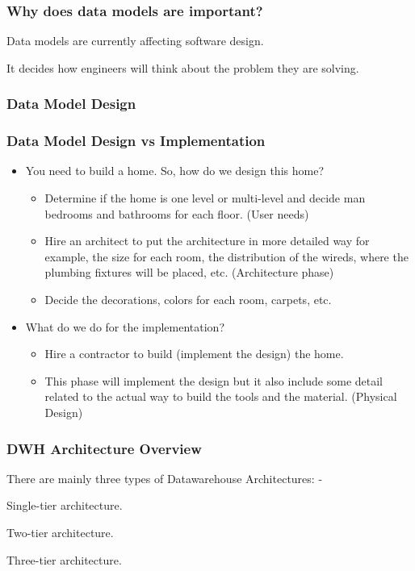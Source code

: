\begin{frame}
\frametitle{Why does data models are important?}
\begin{wideitemize}	
	\item Data models are currently affecting software design. 
	\item It decides how engineers will think about the problem they are solving.
\end{wideitemize}
\end{frame}
\subsubsection{Data Model Design}
\begin{frame}
\frametitle{Data Model Design vs Implementation}
\begin{itemize}[<+->]
	\item You need to build a home. So, how do we design this home?
		\begin{itemize}[<+->]
			\item Determine if the home is one level or multi-level and decide man bedrooms and bathrooms for each floor. (User needs)
			\item Hire an architect to put the architecture in more detailed way for example, the size for each room, the distribution of the wireds, where the plumbing fixtures will be placed, etc. (Architecture phase)
			\item Decide the decorations, colors for each room, carpets, etc. 
		\end{itemize}
	\item What do we do for the implementation?
		\begin{itemize}[<+->]
			\item Hire a contractor to build (implement the design) the home. 
			\item This phase will implement the design but it also include some detail related to the actual way to build the tools and the material. (Physical Design)
		\end{itemize}		
\end{itemize}
\end{frame}


\begin{frame}
\frametitle{DWH Architecture Overview}
There are mainly three types of Datawarehouse Architectures: -
\begin{wideitemize}
	\item Single-tier architecture.
	\item Two-tier architecture.
	\item Three-tier architecture.
\end{wideitemize}

\end{frame}

